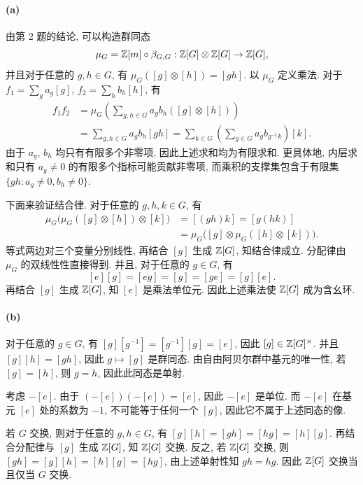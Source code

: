 \documentclass{article}
\begin{document}
\begin{solution}
	\paragraph{(a)} 由第 2 题的结论, 可以构造群同态
	\[ \mu_G = \mathbb{Z}[m] \circ \beta_{G, G}: \mathbb{Z}[G] \otimes \mathbb{Z}[G] \to \mathbb{Z}[G], \]
	并且对于任意的 $g, h \in G$, 有 $\mu_G([g] \otimes [h]) = [gh]$. 以 $\mu_G$ 定义乘法. 对于 $f_1 = \sum_g a_g[g]$, $f_2 = \sum_h b_h[h]$, 有
	\begin{align*}
		f_1f_2
		&= \mu_G\left(\sum_{g, h \in G} a_gb_h([g] \otimes [h])\right) \\
		&= \sum_{g, h \in G} a_gb_h[gh]
		= \sum_{k \in G}\left(\sum_{g \in G}a_gb_{g^{-1}k}\right)[k].
	\end{align*}
	由于 $a_g$, $b_h$ 均只有有限多个非零项, 因此上述求和均为有限求和. 更具体地, 内层求和只有 $a_g \neq 0$ 的有限多个指标可能贡献非零项, 而乘积的支撑集包含于有限集 $\{gh: a_g \neq 0, b_h \neq 0\}$.

	下面来验证结合律. 对于任意的 $g, h, k \in G$, 有
	\begin{align*}
		\mu_G\bigl(\mu_G([g] \otimes [h]) \otimes [k]\bigr)
		&= [(gh)k] = [g(hk)] \\
		&= \mu_G\bigl([g] \otimes \mu_G([h] \otimes [k])\bigr).
	\end{align*}
	等式两边对三个变量分别线性, 再结合 $[g]$ 生成 $\mathbb{Z}[G]$, 知结合律成立. 分配律由 $\mu_G$ 的双线性性直接得到. 并且, 对于任意的 $g \in G$, 有
	\[ [e][g] = [eg] = [g] = [ge] = [g][e]. \]
	再结合 $[g]$ 生成 $\mathbb{Z}[G]$, 知 $[e]$ 是乘法单位元. 因此上述乘法使 $\mathbb{Z}[G]$ 成为含幺环.

	\paragraph{(b)} 对于任意的 $g \in G$, 有 $[g][g^{-1}] = [g^{-1}][g] = [e]$, 因此 $[g] \in \mathbb{Z}[G]^\times$. 并且 $[g][h] = [gh]$, 因此 $g \mapsto [g]$ 是群同态. 由自由阿贝尔群中基元的唯一性, 若 $[g] = [h]$, 则 $g = h$, 因此此同态是单射.

	考虑 $-[e]$. 由于 $(-[e])(-[e]) = [e]$, 因此 $-[e]$ 是单位. 而 $-[e]$ 在基元 $[e]$ 处的系数为 $-1$, 不可能等于任何一个 $[g]$, 因此它不属于上述同态的像.

	若 $G$ 交换, 则对于任意的 $g, h \in G$, 有 $[g][h] = [gh] = [hg] = [h][g]$. 再结合分配律与 $[g]$ 生成 $\mathbb{Z}[G]$, 知 $\mathbb{Z}[G]$ 交换. 反之, 若 $\mathbb{Z}[G]$ 交换, 则 $[gh] = [g][h] = [h][g] = [hg]$, 由上述单射性知 $gh = hg$. 因此 $\mathbb{Z}[G]$ 交换当且仅当 $G$ 交换.


\end{solution}
\end{document}
